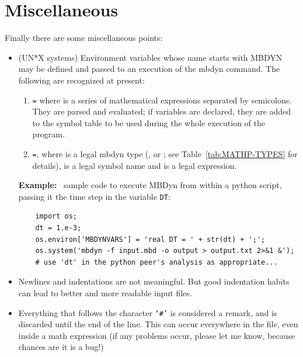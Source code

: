 \section{Miscellaneous}
Finally there are some miscellaneous points:
\begin{itemize}
    \item (UN*X systems) Environment variables whose name starts with MBDYN may
    be defined and passed to an execution of the mbdyn command.
    The following are recognized at present:
  
    \begin{enumerate}
  
        \item \texttt{=}
	where  is a series of mathematical expressions
	separated by semicolons. 
	They are parsed and evaluated; if variables are declared, they are
	added to the symbol table to be used during the whole execution 
	of the program.
    
        \item \texttt{=},
	where  is a legal mbdyn type (, 
	or ; see Table~\ref{tab:MATHP-TYPES} for details),
	 is a legal symbol name and  is a legal
	expression.
    
    \end{enumerate}

    \textbf{Example:} \
    sample code to execute MBDyn from within a python script,
    passing it the time step in the  variable \texttt{DT}:
\begin{verbatim}
    import os;
    dt = 1.e-3;
    os.environ['MBDYNVARS'] = 'real DT = ' + str(dt) + ';';
    os.system('mbdyn -f input.mbd -o output > output.txt 2>&1 &');
    # use 'dt' in the python peer's analysis as appropriate...
\end{verbatim}

    \item Newlines and indentations are not meaningful. But good indentation
    habits can lead to better and more readable input files.
    
    \item Everything that follows the character \texttt{`\#'} is considered a
    remark, and is discarded until the end of the line. 
    This can occur everywhere in the file, even inside a math expression 
    (if any problems occur, please let me know, because chances are 
    it is a bug!)
    

\end{itemize}
